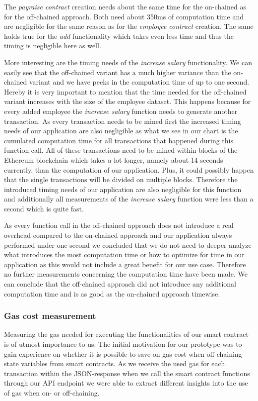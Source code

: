 The \textit{payraise contract} creation needs about the same time for the on-chained as for the off-chained approach. Both need about 350ms of computation time and are negligible for the same reason as for the \textit{employee contract} creation. The same holds true for the \textit{add} functionality which takes even less time and thus the timing is negligible here as well.

More interesting are the timing needs of the \textit{increase salary} functionality. We can easily see that the off-chained variant has a much higher variance than the on-chained variant and we have peeks in the computation time of up to one second. Hereby it is very important to mention that the time needed for the off-chained variant increases with the size of the employee dataset. This happens because for every added employee the \textit{increase salary} function needs to generate another transaction. As every transaction needs to be mined first the increased timing needs of our application are also negligible as what we see in our chart is the cumulated computation time for all transactions that happened during this function call. All of these transactions need to be mined within blocks of the Ethereum blockchain which takes a lot longer, namely about 14 seconds currently, than the computation of our application. Plus, it could possibly happen that the single transactions will be divided on multiple blocks. Therefore the introduced timing needs of our application are also negligible for this function and additionally all measurements of the \textit{increase salary} function were less than a second which is quite fast.%

As every function call in the off-chained approach does not introduce a real overhead compared to the on-chained approach and our application always performed under one second we concluded that we do not need to deeper analyze what introduces the most computation time or how to optimize for time in our application as this would not include a great benefit for our use case. Therefore no further measurements concerning the computation time have been made. We can conclude that the off-chained approach did not introduce any additional computation time and is as good as the on-chained approach timewise.

\subsubsection{Gas cost measurement}
Measuring the gas needed for executing the functionalities of our smart contract is of utmost importance to us. The initial motivation for our prototype was to gain experience on whether it is possible to save on gas cost when off-chaining state variables from smart contracts. As we receive the used gas for each transaction within the JSON-response when we call the smart contract functions through our API endpoint we were able to extract different insights into the use of gas when on- or off-chaining.

